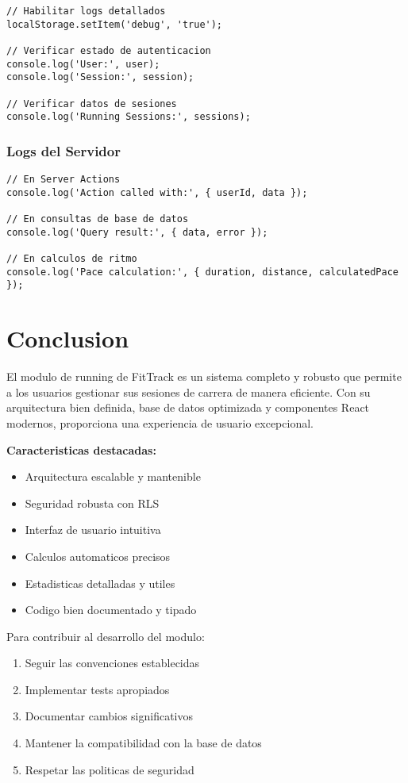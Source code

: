 \documentclass[12pt,a4paper]{article}
\begin{document}
\begin{lstlisting}[caption=Debugging en cliente]
// Habilitar logs detallados
localStorage.setItem('debug', 'true');

// Verificar estado de autenticacion
console.log('User:', user);
console.log('Session:', session);

// Verificar datos de sesiones
console.log('Running Sessions:', sessions);
\end{lstlisting}

\subsubsection{Logs del Servidor}

\begin{lstlisting}[caption=Debugging en servidor]
// En Server Actions
console.log('Action called with:', { userId, data });

// En consultas de base de datos
console.log('Query result:', { data, error });

// En calculos de ritmo
console.log('Pace calculation:', { duration, distance, calculatedPace });
\end{lstlisting}

\section{Conclusion}

El modulo de running de FitTrack es un sistema completo y robusto que permite a los usuarios gestionar sus sesiones de carrera de manera eficiente. Con su arquitectura bien definida, base de datos optimizada y componentes React modernos, proporciona una experiencia de usuario excepcional.

\textbf{Caracteristicas destacadas:}
\begin{itemize}
    \item Arquitectura escalable y mantenible
    \item Seguridad robusta con RLS
    \item Interfaz de usuario intuitiva
    \item Calculos automaticos precisos
    \item Estadisticas detalladas y utiles
    \item Codigo bien documentado y tipado
\end{itemize}

Para contribuir al desarrollo del modulo:
\begin{enumerate}
    \item Seguir las convenciones establecidas
    \item Implementar tests apropiados
    \item Documentar cambios significativos
    \item Mantener la compatibilidad con la base de datos
    \item Respetar las politicas de seguridad
\end{enumerate}
\end{document}
